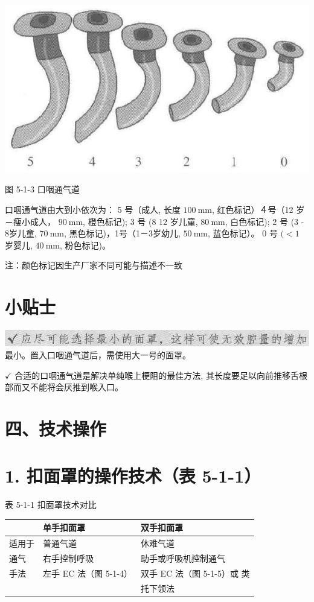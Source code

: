 \documentclass[10pt]{article}
\begin{document}
\begin{center}
\includegraphics[max width=\textwidth]{2024_07_05_645bb794a4d4f32ee0c8g-284(1)}
\end{center}

图 5-1-3 口咽通气道

口咽通气道由大到小依次为： 5 号（成人, 长度 $100 \mathrm{~mm}$, 红色标记）４号（12 岁－瘦小成人， $90 \mathrm{~mm}$, 橙色标记); 3 号 (8 12 岁儿童, $80 \mathrm{~mm}$, 白色标记); 2 号 (3 - 8岁儿童, $70 \mathrm{~mm}$, 黑色标记)，1号（1－3岁幼儿, $50 \mathrm{~mm}$, 蓝色标记）。 0 号 $(<1$ 岁婴儿, $40 \mathrm{~mm}$, 粉色标记)。

注：颜色标记因生产厂家不同可能与描述不一致

\section*{小贴士}
\includegraphics[max width=\textwidth, center]{2024_07_05_645bb794a4d4f32ee0c8g-284}\\
最小。置入口咽通气道后，需使用大一号的面罩。

$\checkmark$ 合适的口咽通气道是解决单纯喉上梗阻的最佳方法, 其长度要足以向前推移舌根部而又不能将会厌推到喉入口。

\section*{四、技术操作}
\section*{1. 扣面罩的操作技术（表 5-1-1）}
表 5-1-1 扣面罩技术对比

\begin{center}
\begin{tabular}{lll}
\hline
 & 单手扣面罩 & 双手扣面罩 \\
\hline
适用于 & 普通气道 & 休难气道 \\
通气 & 右手控制呼吸 & 助手或呼吸机控制通气 \\
手法 & 左手 EC 法（图 5-1-4） & 双手 EC 法（图 5-1-5）或 类 \\
 &  & 托下领法 \\
\hline
\end{tabular}
\end{center}
\end{document}
